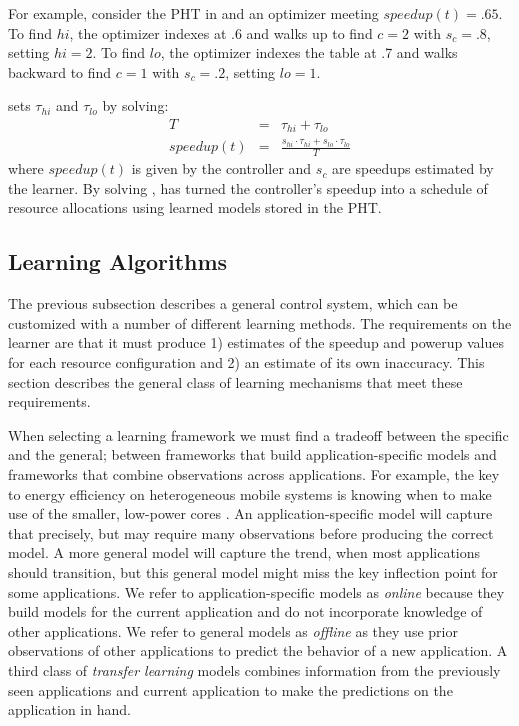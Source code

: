 For example, consider the PHT in  and an optimizer
meeting $speedup(t) = .65$.  To find $hi$, the optimizer indexes at .6
and walks up to find $c=2$ with $s_c=.8$, setting $hi = 2$.  To find
$lo$, the optimizer indexes the table at .7 and walks backward to find
$c=1$ with $s_c=.2$, setting $lo = 1$.

\SYSTEM{} sets $\tau_{hi}$ and $\tau_{lo}$ by solving:
\begin{eqnarray}
  T &=& \tau_{hi} + \tau_{lo}    \label{eqn:s1} \\
  speedup(t) &=& \frac{s_{hi} \cdot \tau_{hi} + s_{lo} \cdot \tau_{lo}}{T} \label{eqn:s2}
\end{eqnarray}
where $speedup(t)$ is given by the controller and $s_c$ are speedups
estimated by the learner.  By solving , \SYSTEM{} has
turned the controller's speedup into a schedule of resource
allocations using learned models stored in the PHT.

\subsection{\SYSTEM{} Learning Algorithms}
The previous subsection describes a general control system, which can
be customized with a number of different learning methods.  The
requirements on the learner are that it must produce 1) estimates of
the speedup and powerup values for each resource configuration and 2)
an estimate of its own inaccuracy.
This section describes the general class of learning mechanisms that
meet these requirements. 

When selecting a learning framework we must find a tradeoff between
the specific and the general; \ie between frameworks that build
application-specific models and frameworks that combine observations
across applications.  For example, the key to energy efficiency on
heterogeneous mobile systems is knowing when to make use of the
smaller, low-power cores \cite{}.  An application-specific model will
capture that precisely, but may require many observations before
producing the correct model.  A more general model will capture the
trend, \eg when most applications should transition, but this general
model might miss the key inflection point for some applications.  We
refer to application-specific models as \emph{online} because they
build models for the current application and do not incorporate
knowledge of other applications.  We refer to general models as
\emph{offline} as they use prior observations of other applications to
predict the behavior of a new application. A third class of
\emph{transfer learning} models combines information from the
previously seen applications and current application to make the
predictions on the application in hand. 

